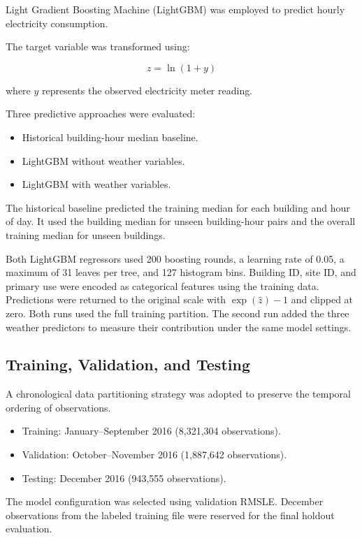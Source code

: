 \documentclass[12pt]{article}
\begin{document}
Light Gradient Boosting Machine (LightGBM) was employed to predict hourly electricity consumption.

The target variable was transformed using:

\begin{equation}
    z = \ln(1+y)
\end{equation}

where $y$ represents the observed electricity meter reading.

Three predictive approaches were evaluated:
\begin{itemize}
    \item Historical building-hour median baseline.
    \item LightGBM without weather variables.
    \item LightGBM with weather variables.
\end{itemize}

The historical baseline predicted the training median for each building and hour of day. It used the building median for unseen building-hour pairs and the overall training median for unseen buildings.

Both LightGBM regressors used 200 boosting rounds, a learning rate of 0.05, a maximum of 31 leaves per tree, and 127 histogram bins. Building ID, site ID, and primary use were encoded as categorical features using the training data. Predictions were returned to the original scale with $\exp(\hat z)-1$ and clipped at zero. Both runs used the full training partition. The second run added the three weather predictors to measure their contribution under the same model settings.

\subsection{Training, Validation, and Testing}

A chronological data partitioning strategy was adopted to preserve the temporal ordering of observations.

\begin{itemize}
    \item Training: January--September 2016 (8,321,304 observations).
    \item Validation: October--November 2016 (1,887,642 observations).
    \item Testing: December 2016 (943,555 observations).
\end{itemize}

The model configuration was selected using validation RMSLE. December observations from the labeled training file were reserved for the final holdout evaluation.
\end{document}
